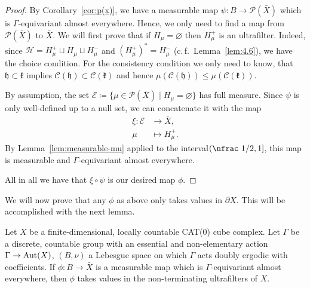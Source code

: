 \begin{proof}
  By Corollary~\ref{cor:p(x)}, we have a measurable map \(\psi\colon B \to \mathcal{P}(\bar X)\) which is \(\Gamma\)-equivariant almost everywhere. Hence, we only need to find a map from \(\mathcal{P}(\bar X)\) to \(\bar X\). We will first prove that if \(H_\mu = \varnothing\) then \(H_\mu^+\) is an ultrafilter. Indeed, since \(\mathcal{H} = H_\mu^+ \sqcup H_\mu \sqcup H_\mu^-\) and \((H_\mu^+)^\ast = H_\mu^-\) (c.\,f.~Lemma~\ref{lem:4.6}), we have the choice condition. For the consistency condition we only need to know, that \(\mathfrak{h} \subset \mathfrak{k}\) implies \(\mathcal{C}(\mathfrak{h}) \subset \mathcal{C}(\mathfrak{k})\) and hence \(\mu(\mathcal{C}(\mathfrak{h}))\leq \mu(\mathcal{C}(\mathfrak{k}))\).

  By assumption, the set \(\mathcal{E} \coloneqq \{\mu \in \mathcal{P}(\bar X) \mid H_\mu = \varnothing\}\) has full measure. Since \(\psi\) is only well-defined up to a null set, we can concatenate it with the map
  \begin{align*}
    \xi\colon \mathcal{E} &\to \bar X,\\
    \mu &\mapsto H_\mu^+.
  \end{align*}
  By Lemma~\ref{lem:measurable-mu} applied to the interval\({(\text{\nfrac 1/2}, 1]}\), this map is measurable and \(\Gamma\)-equivariant almost everywhere.

  All in all we have that \(\xi \circ \psi\) is our desired map \(\phi\).
\end{proof}

We will now prove that any \(\phi\) as above only takes values in \(\partial X\). This will be accomplished with the next lemma.

\begin{lemma}[{\cite[Lemma~4.11]{MR3509968}}]
  \label{lem:4.11}
  Let \(X\) be a finite-dimensional, locally countable CAT(0) cube complex. Let  \(\Gamma\) be a discrete, countable group with an essential and non-elementary action \(\Gamma \to \operatorname{Aut}(X)\), \((B, \nu)\) a Lebesgue space on which \(\Gamma\) acts doubly ergodic with coefficients. If \(\phi\colon B \to \bar X\) is a measurable map which is \(\Gamma\)-equivariant almost everywhere, then \(\phi\) takes values in the non-terminating ultrafilters of \(X\).
\end{lemma}

